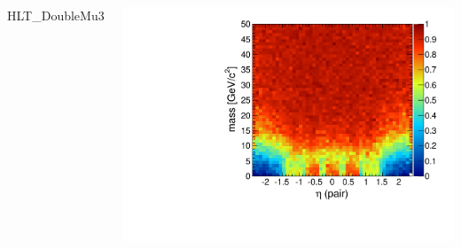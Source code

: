 \documentclass[compress]{beamer}
\begin{document}
\begin{frame}
\begin{columns}
\centering HLT\_DoubleMu3

\includegraphics[width=\linewidth]{masseta_DMu3.pdf}
\end{columns}
\end{frame}
\end{document}
